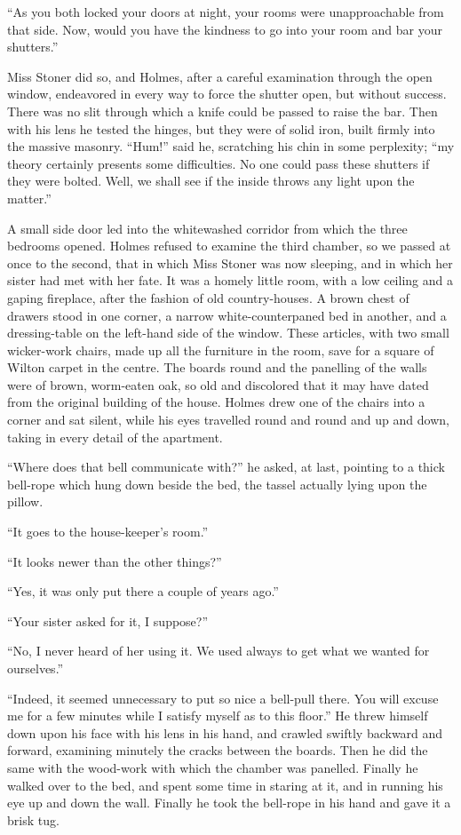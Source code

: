 “As you both locked your doors at night, your rooms were
unapproachable from that side. Now, would you have the
kindness to go into your room and bar your shutters.”

Miss Stoner did so, and Holmes, after a careful examination
through the open window, endeavored in every way to
force the shutter open, but without success. There was no
slit through which a knife could be passed to raise the bar.
Then with his lens he tested the hinges, but they were of
solid iron, built firmly into the massive masonry. “Hum!”
said he, scratching his chin in some perplexity; “my theory
certainly presents some difficulties. No one could pass these
shutters if they were bolted. Well, we shall see if the inside
throws any light upon the matter.”

A small side door led into the whitewashed corridor from
which the three bedrooms opened. Holmes refused to examine
the third chamber, so we passed at once to the second,
that in which Miss Stoner was now sleeping, and in which her
sister had met with her fate. It was a homely little room,
with a low ceiling and a gaping fireplace, after the fashion of
old country-houses. A brown chest of drawers stood in one
corner, a narrow white-counterpaned bed in another, and a
dressing-table on the left-hand side of the window. These
articles, with two small wicker-work chairs, made up all the
furniture in the room, save for a square of Wilton carpet in
the centre. The boards round and the panelling of the walls
were of brown, worm-eaten oak, so old and discolored that it
may have dated from the original building of the house.
Holmes drew one of the chairs into a corner and sat silent,
while his eyes travelled round and round and up and down,
taking in every detail of the apartment.

“Where does that bell communicate with?” he asked, at
last, pointing to a thick bell-rope which hung down beside the
bed, the tassel actually lying upon the pillow.

“It goes to the house-keeper’s room.”

“It looks newer than the other things?”

“Yes, it was only put there a couple of years ago.”

“Your sister asked for it, I suppose?”

“No, I never heard of her using it. We used always to get
what we wanted for ourselves.”

“Indeed, it seemed unnecessary to put so nice a bell-pull
there. You will excuse me for a few minutes while I satisfy
myself as to this floor.” He threw himself down upon his
face with his lens in his hand, and crawled swiftly backward
and forward, examining minutely the cracks between the
boards. Then he did the same with the wood-work with
which the chamber was panelled. Finally he walked over to
the bed, and spent some time in staring at it, and in running
his eye up and down the wall. Finally he took the bell-rope
in his hand and gave it a brisk tug.

